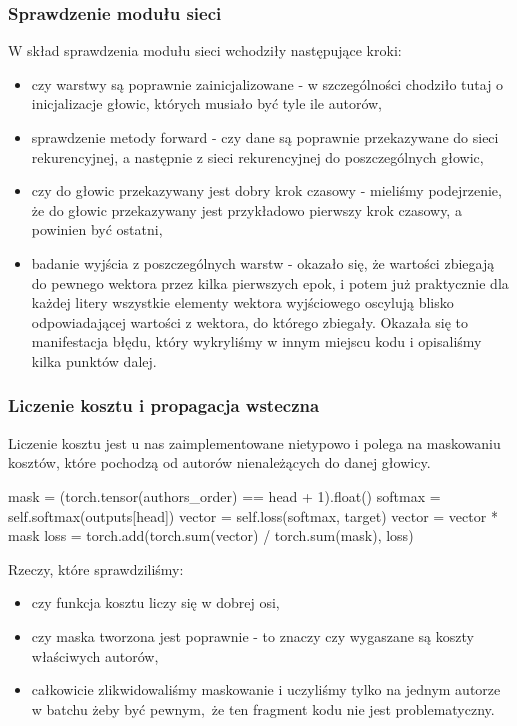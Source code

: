 \subsubsection{Sprawdzenie modułu sieci}
W skład sprawdzenia modułu sieci wchodziły następujące kroki:
	\begin{itemize}
	  \item {czy warstwy są poprawnie zainicjalizowane - w szczególności chodziło tutaj o inicjalizacje głowic,
	  których musiało być tyle ile autorów,}
	  \item {sprawdzenie metody forward - czy dane są poprawnie przekazywane do sieci rekurencyjnej, a następnie
	  z sieci rekurencyjnej do poszczególnych głowic,}
	  \item {czy do głowic przekazywany jest dobry krok czasowy - mieliśmy podejrzenie, że do głowic przekazywany jest przykładowo
	  pierwszy krok czasowy, a powinien być ostatni,}
	  \item {badanie wyjścia z poszczególnych warstw - okazało się, że wartości zbiegają do pewnego wektora przez kilka pierwszych epok,
	  i potem już praktycznie dla każdej litery wszystkie elementy wektora wyjściowego oscylują blisko odpowiadającej wartości z  wektora,
	  do którego zbiegały. Okazała się to manifestacja błędu, który wykryliśmy w innym miejscu kodu i opisaliśmy kilka punktów dalej.}
	\end{itemize}

\subsubsection{Liczenie kosztu i propagacja wsteczna}
Liczenie kosztu jest u nas zaimplementowane nietypowo i polega na maskowaniu kosztów, które pochodzą od autorów
nienależących do danej głowicy.
\begin{python}
mask = (torch.tensor(authors_order) == head + 1).float()
softmax = self.softmax(outputs[head])
vector = self.loss(softmax, target)
vector = vector * mask
loss = torch.add(torch.sum(vector) / torch.sum(mask), loss)

\end{python}
Rzeczy, które sprawdziliśmy:
\begin{itemize}
	  \item {czy funkcja kosztu liczy się w dobrej osi,}
	  \item {czy maska tworzona jest poprawnie - to znaczy czy wygaszane są koszty właściwych autorów,}
	  \item {całkowicie zlikwidowaliśmy maskowanie i uczyliśmy tylko na jednym autorze w batchu żeby być pewnym, że ten fragment
	  kodu nie jest problematyczny.}
\end{itemize}

